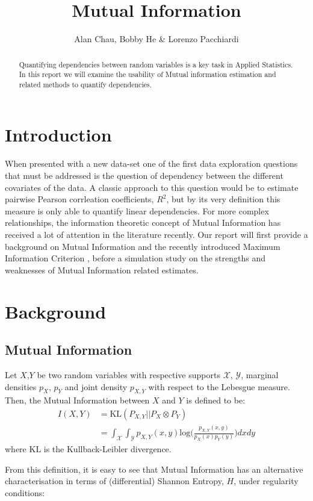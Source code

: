 \documentclass[a4paper]{article}
\title{Mutual Information}
\author{Alan Chau, Bobby He \& Lorenzo Pacchiardi}
\begin{document}
\maketitle

\begin{abstract}
Quantifying dependencies between random variables is a key task in Applied Statistics. In this report we will examine the usability of Mutual information estimation and related methods to quantify dependencies.
\end{abstract}

\section{Introduction}
When presented with a new data-set one of the first data exploration questions that must be addressed is the question of dependency between the different covariates of the data. A classic approach to this question would be to estimate pairwise Pearson corrleation coefficients, $R^2$, but by its very definition this measure is only able to quantify linear dependencies. For more complex relationships, the information theoretic concept of Mutual Information has received a lot of attention in the literature recently. Our report will first provide a background on Mutual Information and the recently introduced Maximum Information Criterion \citep{Reshef}, before a simulation study on the strengths and weaknesses of Mutual Information related estimates. 

\section{Background}
\subsection{Mutual Information}
Let $X$,$Y$ be two random variables with respective supports $\mathcal{X}$, $\mathcal{Y}$, marginal densities $p_X$, $p_Y$ and joint density $p_{X,Y}$ with respect to the Lebesgue measure. Then, the Mutual Information between $X$ and $Y$ is defined to be:
\begin{align}
I(X,Y)&=\text{KL}(P_{X,Y}||P_X \otimes P_Y)\\
&= \int_{\mathcal{X}}\int_{\mathcal{Y}}p_{X,Y}(x,y)\text{log}\big(\frac{p_{X,Y}(x,y)}{p_X(x)p_Y(y)}\big)dxdy
\end{align}
where $\text{KL}$ is the Kullback-Leibler divergence. 

From this definition, it is easy to see that Mutual Information has an alternative characterisation in terms of (differential) Shannon Entropy, $H$, under regularity conditions:
\end{document}
